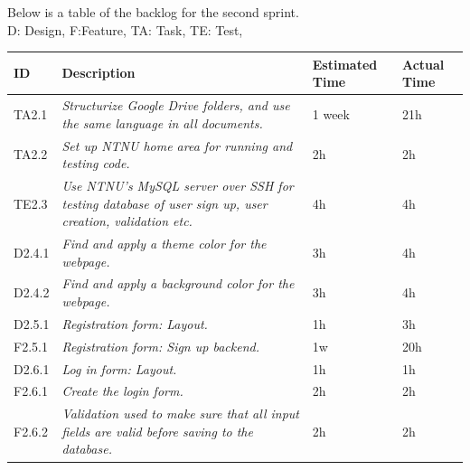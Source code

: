 Below is a table of the backlog for the second sprint. \\ D: Design, F:Feature, TA: Task, TE: Test, 

\begin{minipage}{\linewidth}
\setlength{\tabcolsep}{12pt}
\centering
{}
\begin{tabular}{|p{1cm}|p{4cm}|p{2cm}|p{2cm}|}
\hline
\cellcolor{gray!25} ID & \cellcolor{gray!25} Description & \cellcolor{gray!25} Estimated Time & \cellcolor{gray!25} Actual Time \\
\hline
TA2.1 & \it{Structurize Google Drive folders, and use the same language in all documents.} & 1 week & 21h \\
TA2.2 & \it{Set up NTNU home area for running and testing code.} & 2h & 2h \\
TE2.3 & \it{Use NTNU's MySQL server over SSH for testing database of user sign up, user creation, validation etc. } & 4h & 4h \\
D2.4.1 & \it{Find and apply a theme color for the webpage. } & 3h & 4h \\
D2.4.2 & \it{Find and apply a background color for the webpage.} & 3h & 4h \\
D2.5.1 & \it{Registration form: Layout.} & 1h & 3h \\
F2.5.1 & \it{Registration form: Sign up backend.} & 1w & 20h \\
D2.6.1 & \it{Log in form: Layout.} & 1h & 1h \\
F2.6.1 & \it{Create the login form.} & 2h & 2h \\
F2.6.2 & \it{Validation used to make sure that all input fields are valid before saving to the database. } & 2h & 2h\\
\hline
\end{tabular}
\end{minipage}

